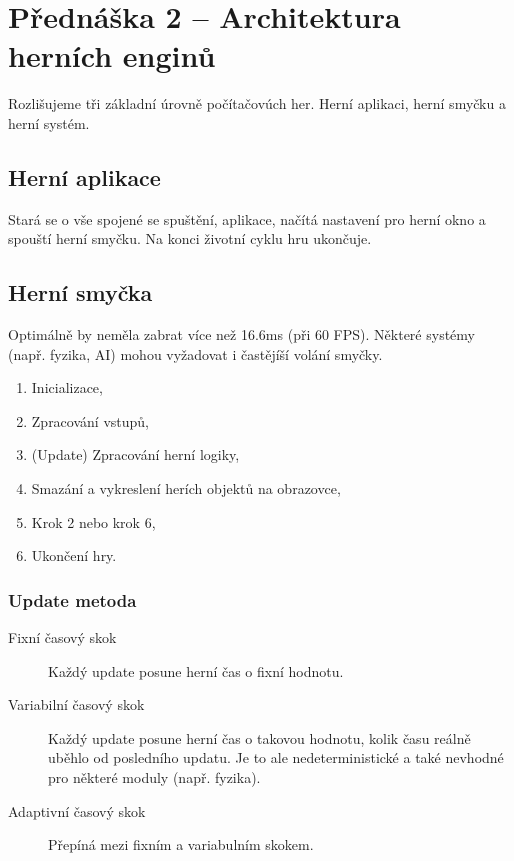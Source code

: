 \section{Přednáška 2 -- Architektura herních enginů}

Rozlišujeme tři základní úrovně počítačovúch her.
Herní aplikaci, herní smyčku a herní systém.

\subsection*{Herní aplikace}

Stará se o vše spojené se spuštění, aplikace, načítá nastavení pro herní okno a spouští herní smyčku.
Na konci životní cyklu hru ukončuje.

\subsection*{Herní smyčka}

Optimálně by neměla zabrat více než 16.6ms (při 60 FPS).
Některé systémy (např. fyzika, AI) mohou vyžadovat i častějíší volání smyčky.


\begin{enumerate}
    \item Inicializace,
    \item Zpracování vstupů,
    \item (Update) Zpracování herní logiky,
    \item Smazání a vykreslení herích objektů na obrazovce,
    \item Krok 2 nebo krok 6,
    \item Ukončení hry.
\end{enumerate}

\subsubsection*{Update metoda}

\begin{description}
    \item[Fixní časový skok] Každý update posune herní čas o fixní hodnotu.
    \item[Variabilní časový skok] Každý update posune herní čas o takovou hodnotu, kolik času reálně uběhlo od posledního updatu. Je to ale nedeterministické a také nevhodné pro některé moduly (např. fyzika).
    \item[Adaptivní časový skok] Přepíná mezi fixním a variabulním skokem.
\end{description}

